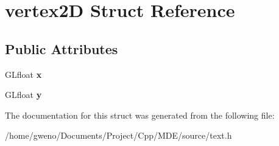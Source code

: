 \hypertarget{structvertex2D}{}\section{vertex2D Struct Reference}
\label{structvertex2D}
\subsection*{Public Attributes}
\begin{DoxyCompactItemize}
\item 
G\+Lfloat {\bfseries x}\hypertarget{structvertex2D_a345c16e7c8bba6bd49d9e27d363b4dfa}{}\label{structvertex2D_a345c16e7c8bba6bd49d9e27d363b4dfa}

\item 
G\+Lfloat {\bfseries y}\hypertarget{structvertex2D_a74ea0c953b53fe775bb7e054b4e974e5}{}\label{structvertex2D_a74ea0c953b53fe775bb7e054b4e974e5}

\end{DoxyCompactItemize}


The documentation for this struct was generated from the following file\+:\begin{DoxyCompactItemize}
\item 
/home/gweno/\+Documents/\+Project/\+Cpp/\+M\+D\+E/source/text.\+h\end{DoxyCompactItemize}
